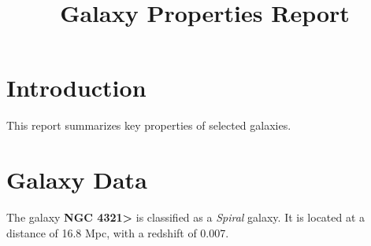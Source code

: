 \documentclass{article}
\title{Galaxy Properties Report}
\author{}
\date{}
\begin{document}
\maketitle

\section{Introduction}
This report summarizes key properties of selected galaxies.

\section{Galaxy Data}
The galaxy \textbf{NGC 4321>} is classified as a \textit{Spiral} galaxy. 
It is located at a distance of 16.8 Mpc, with a redshift of 0.007.
\end{document}
